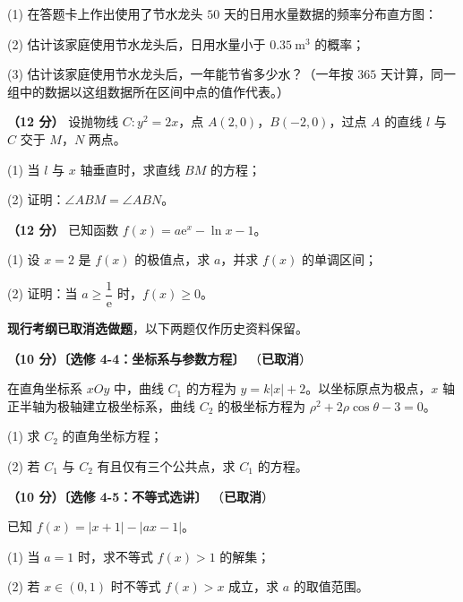   (1) 在答题卡上作出使用了节水龙头 $50$ 天的日用水量数据的频率分布直方图：

\begin{center}\end{center}

  (2) 估计该家庭使用节水龙头后，日用水量小于 $0.35\ \mathrm m^{3}$ 的概率；

  (3) 估计该家庭使用节水龙头后，一年能节省多少水？（一年按 $365$ 天计算，同一组中的数据以这组数据所在区间中点的值作代表。）

\textbf{（12 分）} 设抛物线 $C:y^{2}=2x$，点 $A(2,0)$，$B(-2,0)$，过点 $A$ 的直线 $l$ 与 $C$ 交于 $M$，$N$ 两点。

  (1) 当 $l$ 与 $x$ 轴垂直时，求直线 $BM$ 的方程；

  (2) 证明：$\angle ABM=\angle ABN$。

\textbf{（12 分）} 已知函数 $f(x)=a\mathrm e^{x}-\ln x-1$。

  (1) 设 $x=2$ 是 $f(x)$ 的极值点，求 $a$，并求 $f(x)$ 的单调区间；

  (2) 证明：当 $a\ge\dfrac1{\mathrm e}$ 时，$f(x)\ge0$。

\par\medskip


\begin{gktip}
\textbf{ 现行考纲已取消选做题}，以下两题仅作历史资料保留。
\end{gktip}

\textbf{（10 分）〔选修 4-4：坐标系与参数方程〕} （\textbf{已取消}）

在直角坐标系 $xOy$ 中，曲线 $C_1$ 的方程为 $y=k|x|+2$。以坐标原点为极点，$x$ 轴正半轴为极轴建立极坐标系，曲线 $C_2$ 的极坐标方程为 $\rho^{2}+2\rho\cos\theta-3=0$。

  (1) 求 $C_2$ 的直角坐标方程；

  (2) 若 $C_1$ 与 $C_2$ 有且仅有三个公共点，求 $C_1$ 的方程。

\textbf{（10 分）〔选修 4-5：不等式选讲〕} （\textbf{已取消}）

已知 $f(x)=|x+1|-|ax-1|$。

  (1) 当 $a=1$ 时，求不等式 $f(x)>1$ 的解集；

  (2) 若 $x\in(0,1)$ 时不等式 $f(x)>x$ 成立，求 $a$ 的取值范围。

\par\medskip


